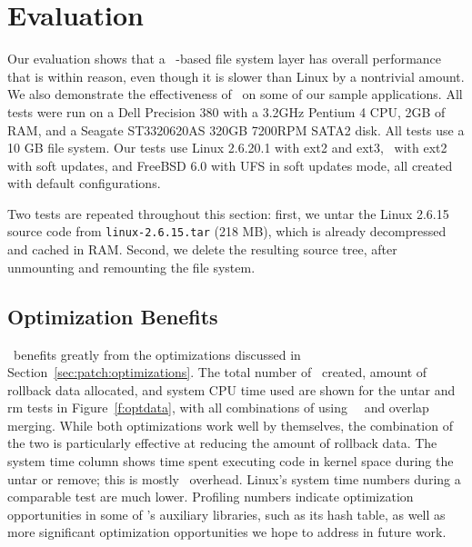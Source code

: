\section {Evaluation}
\label{sec:evaluation}

Our evaluation shows that a \Kudos\ \patch-based file system layer has
overall performance that is within reason, even though it is slower than
Linux by a nontrivial amount.  We also demonstrate the effectiveness of
\opgroups\ on some of our sample applications. All tests were run on a Dell
Precision 380 with a 3.2GHz Pentium 4 CPU, 2GB of RAM, and a Seagate
ST3320620AS 320GB 7200RPM SATA2 disk.
%
All tests use a 10 GB file system.
%
Our tests use Linux 2.6.20.1 with ext2 and ext3, \Kudos\ with ext2 with
soft updates, and FreeBSD 6.0 with UFS in soft updates mode, all created
with default configurations.

Two tests are repeated throughout this section: first, we untar
the Linux 2.6.15 source code from \texttt{linux-2.6.15.tar} (218 MB), which is
already decompressed and cached in RAM. Second, we delete the resulting source
tree, after unmounting and remounting the file system.

\subsection {Optimization Benefits}

\Kudos\ benefits greatly from the optimizations discussed in
Section~\ref{sec:patch:optimizations}. The total number of \chdescs\ created,
amount of rollback data allocated, and system CPU time used are shown for the
untar and rm tests in Figure~\ref{f:optdata}, with all combinations of using
\nrb\ \chdescs\ and overlap merging. While both optimizations work well by
themselves, the combination of the two is particularly effective at reducing the
amount of rollback data.
%
The system time column shows time spent executing code in kernel space
during the untar or remove; this is mostly \Dodder\ overhead.  Linux's
system time numbers during a comparable test are much lower.  Profiling
numbers indicate optimization opportunities in some of \Dodder's auxiliary
libraries, such as its hash table, as well as more significant optimization
opportunities we hope to address in future work.


